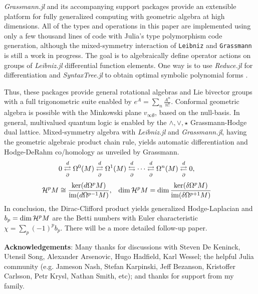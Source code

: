 \documentclass{juliacon}
\begin{document}
\textit{Grassmann.jl} and its accompanying support packages provide an extensible platform for fully generalized computing with geometric algebra at high dimensions.
All of the types and operations in this paper are implemented using only a few thousand lines of code with Julia's type polymorphism code generation, although the mixed-symmetry interaction of \verb`Leibniz` and \verb`Grassmann` is still a work in progress.
The goal is to algebraically define operator actions on groups of \textit{Leibniz.jl} differential function elements. 
One way is to use \textit{Reduce.jl} for differentiation and \textit{SyntaxTree.jl} to obtain optimal symbolic polynomial forms \cite{optim-poly}.

Thus, these packages provide general rotational algebras and Lie bivector groups with a full trigonometric suite enabled by $ e^{A} = \sum_n \frac{A^n}{n!} $.
Conformal geometric algebra is possible with the Minkowski plane $v_{\infty\emptyset}$, based on the null-basis.
In general, multivalued quantum logic is enabled by the $\wedge,\vee,\star$ Grassmann-Hodge dual lattice.
Mixed-symmetry algebra with \textit{Leibniz.jl} and \textit{Grassmann.jl}, having the geometric algebraic product chain rule, yields automatic differentiation and Hodge-DeRahm co/homology  as unveiled by Grassmann.
\begin{align*}
	0 &\overset{d}{\underset{\partial}{\rightleftarrows}} \Omega^0(M) \overset{d}{\underset{\partial}{\rightleftarrows}} \Omega^1(M) \overset{d}{\underset{\partial}{\leftrightarrows}} \cdots \overset{d}{\underset{\partial}{\rightleftarrows}} \Omega^n(M) \overset{d}{\underset{\partial}{\rightleftarrows}} 0,
\end{align*}
\begin{align*}
	\mathcal{H}^pM &\cong \frac{\ker(d\Omega^pM)}{\text{im}(d\Omega^{p-1}M)}, & \dim\mathcal{H}^pM &= \dim\frac{\ker(\delta\Omega^pM)}{\text{im}(\delta\Omega^{p+1}M)}
\end{align*}
In conclusion, the Dirac-Clifford product yields generalized Hodge-Laplacian and $b_p=\dim\mathcal{H}^pM$ are the Betti numbers with Euler characteristic $\chi = \sum_p (-1)^pb_p$.
There will be a more detailed follow-up paper.

\textbf{Acknowledgements}: Many thanks for discussions with Steven De Keninck, Utensil Song, Alexander Arsenovic, Hugo Hadfield, Karl Wessel; the helpful Julia community (e.g. Jameson Nash, Stefan Karpinski, Jeff Bezanson, Kristoffer Carlsson, Petr Krysl, Nathan Smith, etc); and thanks for support from my family.
\end{document}
